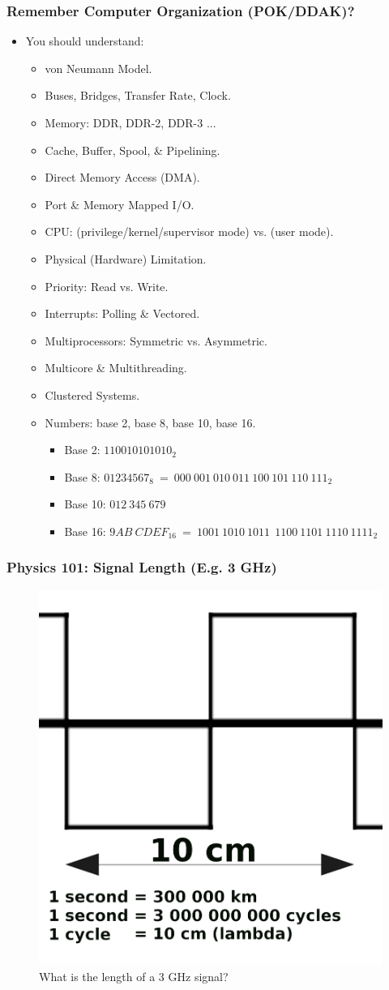 \documentclass[xcolor=table, notheorems, hyperref={pdfpagelabels=false}]{beamer}
\begin{document}
\begin{frame}
\frametitle{Remember Computer Organization (POK/DDAK)?}
\begin{itemize}
\item You should understand:
\begin{itemize}
\item von Neumann Model.
\item Buses, Bridges, Transfer Rate, Clock.
\item Memory: DDR, DDR-2, DDR-3 ...
\item Cache, Buffer, Spool, \& Pipelining.
\item Direct Memory Access (DMA).
\item Port \& Memory Mapped I/O.
\item CPU: (privilege/kernel/supervisor mode) vs. (user mode).
\item Physical (Hardware) Limitation.
\item Priority: Read vs. Write.
\item Interrupts: Polling \& Vectored.
\item Multiprocessors: Symmetric vs. Asymmetric.
\item Multicore \& Multithreading.
\item Clustered Systems.
\item Numbers: base 2, base 8, base 10, base 16.
\begin{itemize}
\item Base 2: $110010101010_2$
\item Base 8: $01234567_8\ =\ 000\ 001\ 010\ 011\ 100\ 101\ 110\ 111_2$
\item Base 10: $012\ 345\ 679$
\item Base 16: $9AB\ CDEF_{16}\ =\ 1001\ 1010\ 1011\ \ 1100\ 1101\ 1110\ 1111_2$
\end{itemize}
\end{itemize}
\end{itemize}
\end{frame}

\begin{frame}
\frametitle{Physics 101: Signal Length (E.g. 3 GHz)}
\begin{figure}
\includegraphics[width=0.50\linewidth]{os-wave3}
\caption{What is the length of a 3 GHz signal?}
\end{figure}
\end{frame}
\end{document}
